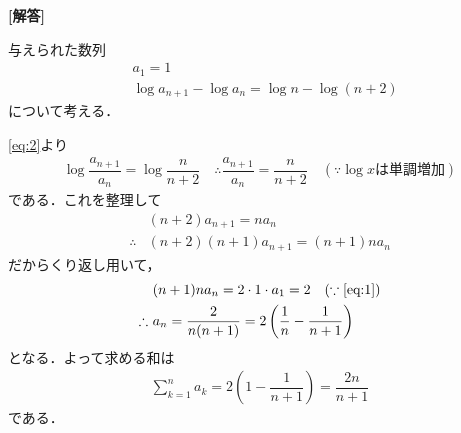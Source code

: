 \documentclass[../../main.tex]{subfiles}
\begin{document}
\begin{oframed}
  
\end{oframed}

{\bf [解答]}

与えられた数列
\begin{align}
  & a_1=1 \label{eq:1}\\
  & \log a_{n+1}-\log a_n=\log n-\log(n+2) \label{eq:2}
\end{align}
について考える．

\cref{eq:2}より
\begin{align}
  \log\dfrac{a_{n+1}}{a_n}=\log\dfrac{n}{n+2}
  \quad\therefore
  \dfrac{a_{n+1}}{a_n}=\dfrac{n}{n+2} \quad (\because \log x \text{は単調増加}) \label{eq:3}
\end{align}
である．これを整理して
\begin{align}
  & (n+2)a_{n+1}=na_n \\
  \therefore
  & (n+2)(n+1)a_{n+1}=(n+1)na_n
\end{align}
だからくり返し用いて，
\begin{align}
  & (n+1)na_n=2\cdot1\cdot a_1=2 \quad (\because\text{\cref{eq:1}}) \\
  \therefore\
  & a_n=\dfrac{2}{n(n+1)}=2\left(\dfrac{1}{n}-\dfrac{1}{n+1}\right)
\end{align}
となる．よって求める和は
\begin{align}
  \sum_{k=1}^na_k=2\left(1-\dfrac{1}{n+1}\right)=\dfrac{2n}{n+1}
\end{align}
である．

\newpage
\end{document}
